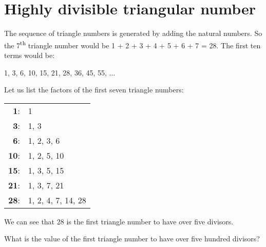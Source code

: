 \section[Problem \#12: Highly divisible triangular number]{Highly divisible triangular number}
\label{sec:problem_12}

The sequence of triangle numbers is generated by adding the natural
numbers. So the 7\textsuperscript{th} triangle number would be 1 + 2 + 3
+ 4 + 5 + 6 + 7 = 28. The first ten terms would be:

\begin{center}1, 3, 6, 10, 15, 21, 28, 36, 45, 55, ...\end{center}

Let us list the factors of the first seven triangle numbers:

\begin{longtable}[]{@{}rl@{}}
\textbf{1}: & 1\\
\textbf{3}: & 1, 3\\
\textbf{6}: & 1, 2, 3, 6\\
\textbf{10}: & 1, 2, 5, 10\\
\textbf{15}: & 1, 3, 5, 15\\
\textbf{21}: & 1, 3, 7, 21\\
\textbf{28}: & 1, 2, 4, 7, 14, 28\\
\end{longtable}

We can see that 28 is the first triangle number to have over five
divisors.

What is the value of the first triangle number to have over five hundred
divisors?
